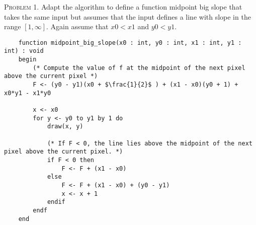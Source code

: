 \documentclass[a4paper, 12pt]{article}
\begin{document}

\textsc{Problem 1.} Adapt the algorithm to define a function midpoint big slope that takes the same input
but assumes that the input defines a line with slope in the range $[1, \infty]$. Again assume that $x0 < x1$
and $y0 < y1$.

\begin{lstlisting}
    function midpoint_big_slope(x0 : int, y0 : int, x1 : int, y1 : int) : void
    begin
        (* Compute the value of f at the midpoint of the next pixel above the current pixel *)
        F <- (y0 - y1)(x0 + $\frac{1}{2}$ ) + (x1 - x0)(y0 + 1) + x0*y1 - x1*y0

        x <- x0
        for y <- y0 to y1 by 1 do
            draw(x, y)

            (* If F < 0, the line lies above the midpoint of the next pixel above the current pixel. *)
            if F < 0 then
                F <- F + (x1 - x0)
            else
                F <- F + (x1 - x0) + (y0 - y1)
                x <- x + 1
            endif
        endf
    end
\end{lstlisting}
\end{document}
